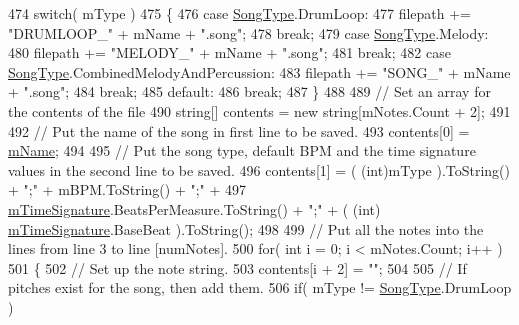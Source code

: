 \begin{DoxyCodeInclude}
474         \textcolor{keywordflow}{switch}( mType )
475         \{
476             \textcolor{keywordflow}{case} \hyperlink{group___song_enums_gae681a1f001333e39fc1cb4fea97bfe1b}{SongType}.DrumLoop:
477                 filepath += \textcolor{stringliteral}{"DRUMLOOP\_"} + mName + \textcolor{stringliteral}{".song"};
478                 \textcolor{keywordflow}{break};
479             \textcolor{keywordflow}{case} \hyperlink{group___song_enums_gae681a1f001333e39fc1cb4fea97bfe1b}{SongType}.Melody:
480                 filepath += \textcolor{stringliteral}{"MELODY\_"} + mName + \textcolor{stringliteral}{".song"};
481                 \textcolor{keywordflow}{break};
482             \textcolor{keywordflow}{case} \hyperlink{group___song_enums_gae681a1f001333e39fc1cb4fea97bfe1b}{SongType}.CombinedMelodyAndPercussion:
483                 filepath += \textcolor{stringliteral}{"SONG\_"} + mName + \textcolor{stringliteral}{".song"};
484                 \textcolor{keywordflow}{break};
485             \textcolor{keywordflow}{default}:
486                 \textcolor{keywordflow}{break};
487         \}
488 
489         \textcolor{comment}{// Set an array for the contents of the file}
490         \textcolor{keywordtype}{string}[] contents = \textcolor{keyword}{new} \textcolor{keywordtype}{string}[mNotes.Count + 2];
491 
492         \textcolor{comment}{// Put the name of the song in first line to be saved.}
493         contents[0] = \hyperlink{group___song_priv_var_ga6a5e6c1e4aa92939e2b5c1e3d9908df8}{mName};
494 
495         \textcolor{comment}{// Put the song type, default BPM and the time signature values in the second line to be saved.}
496         contents[1] = ( (int)mType ).ToString() + \textcolor{stringliteral}{";"} + mBPM.ToString() + \textcolor{stringliteral}{";"} +
497             \hyperlink{group___song_priv_var_ga2b2dcc0e83e49f7303b6a1371877b25e}{mTimeSignature}.BeatsPerMeasure.ToString() + \textcolor{stringliteral}{";"} + ( (int)
      \hyperlink{group___song_priv_var_ga2b2dcc0e83e49f7303b6a1371877b25e}{mTimeSignature}.BaseBeat ).ToString();
498 
499         \textcolor{comment}{// Put all the notes into the lines from line 3 to line [numNotes].  }
500         \textcolor{keywordflow}{for}( \textcolor{keywordtype}{int} i = 0; i < mNotes.Count; i++ )
501         \{
502             \textcolor{comment}{// Set up the note string.}
503             contents[i + 2] = \textcolor{stringliteral}{""};
504 
505             \textcolor{comment}{// If pitches exist for the song, then add them.}
506             \textcolor{keywordflow}{if}( mType != \hyperlink{group___song_enums_gae681a1f001333e39fc1cb4fea97bfe1b}{SongType}.DrumLoop )

\end{DoxyCodeInclude}
